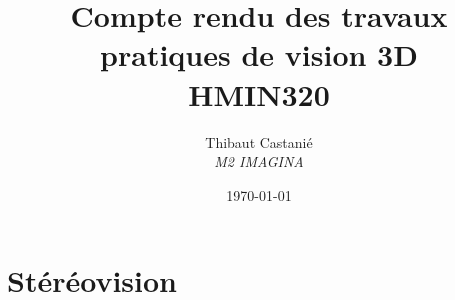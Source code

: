 \documentclass[a4paper,11pt]{article}
\title{\textbf{Compte rendu des travaux \\pratiques de vision 3D}\\HMIN320}
\author{Thibaut Castanié\\\textit{M2 IMAGINA}}
\date{\today}
\begin{document}
\maketitle
\renewcommand{\cftsecleader}{\cftdotfill{\cftdotsep}}
\tableofcontents
\thispagestyle{empty}

\newpage 

\section{Stéréovision}
\end{document}
